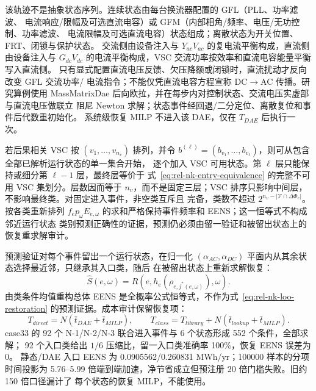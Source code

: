 该轨迹不是抽象状态序列。连续状态由每台换流器配置的 GFL（PLL、功率滤波、
电流响应/限幅及可选直流电容）或 GFM（内部相角/频率、电压/无功控制、功率滤波、
电流限幅及可选直流电容）状态组成；离散状态为开关位置、FRT、闭锁与保护状态。
交流侧由设备注入与 $Y_{ac}V_{ac}$ 的复电流平衡构成，直流侧由设备注入与
$G_{dc}V_{dc}$ 的电流平衡构成，VSC 交流功率按效率和直流电容能量平衡写入直流侧。
只有显式配置直流电压反馈、欠压降额或闭锁时，直流扰动才反向改变 GFL 交流功率/
电流指令；不能仅凭直流电容方程宣称 DC$\rightarrow$AC 传播。研究算例使用
MassMatrixDae 后向欧拉，并在每步内对控制状态、交流电压实虚部与直流电压做联立
阻尼 Newton 求解；状态事件经回退/二分定位、离散复位和事件后代数重初始化。
系统级恢复 MILP 不进入该 DAE，仅在 $T_{DAE}$ 后执行一次。

若后果相关 VSC 按 $(v_1,\ldots,v_{n_v})$ 排列，并令
$b^{(\ell)}=(b_{v_1},\ldots,b_{v_\ell})$，则可从包含全部已解析运行状态的单一集合开始，
逐个加入 VSC 可用状态。第 $\ell$ 层只能保持或细分第 $\ell-1$ 层，最终层等价于
式~\eqref{eq:rel-nk-entry-equivalence} 的完整不可用 VSC 集划分。层数因而等于
$n_v$，而不是固定三层；VSC 排序只影响中间层，不影响最终类。对固定进入事件，非空类互斥且
完备，类数不超过 $2^{n_v-|\mathcal V\cap\Delta\Phi_e|}$。按各类重新排列
$f_ep_\omega E_{e,\omega}$ 的求和严格保持事件频率和 EENS；这一恒等式不构成邻近运行状态
类别预测正确性的证据，预测仍必须由留一验证和被留出状态上的恢复重求解审计。

预测验证对每个事件留出一个运行状态，在归一化
$(\alpha_{AC},\alpha_{DC})$ 平面内从其余状态选择最近邻，只继承其入口类，随后
在被留出状态上重新求解恢复：
\begin{equation}
 \widehat S(e,\omega)=R\!\left(e,
 h_e(\rho_{e,j^*(e,\omega)}),\omega\right).
 \label{eq:rel-nk-loo-restoration}
\end{equation}
由类条件均值重构总体 EENS 是全概率公式恒等式，不作为式~\eqref{eq:rel-nk-loo-restoration}
的预测证据。成本审计保留恢复项：
\begin{equation}
 T_{direct}=N(\bar t_{DAE}+\bar t_{MILP}),\qquad
 T_{class}=T_{library}+N(\bar t_{lookup}+\bar t_{MILP}).
 \label{eq:rel-nk-cost}
\end{equation}
case33 的 92 个 N-1/N-2/N-3 联合进入事件与 6 个状态形成 552 个条件，全部求解；
92 个入口类给出 $1/6$ 压缩比，留一入口类准确率 100\%，恢复 EENS 误差为 0。
静态/DAE 入口 EENS 为 0.0905562/0.260831 MWh/yr；100000 样本的分项时间投影为
5.76--5.99 倍端到端加速，净节省成立但预注册 20 倍门槛失败。旧约 150 倍口径漏计了
每个状态的恢复 MILP，不能使用。

